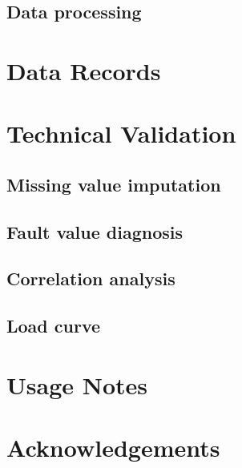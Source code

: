 \documentclass[12pt]{article}
\begin{document}
\subsection*{Data processing}

\section*{Data Records}

\section*{Technical Validation}
\subsection*{Missing value imputation}

\subsection*{Fault value diagnosis}

\subsection*{Correlation analysis}
\subsection*{Load curve}

\section*{Usage Notes}

\section*{Acknowledgements}

\end{document}

